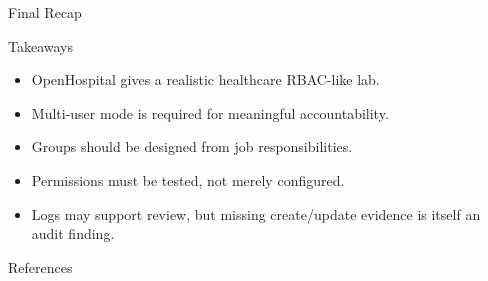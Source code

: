 \documentclass[presentation]{beamer}
\begin{document}
\begin{frame}[c]{Final Recap}
\begin{block}{Takeaways}
\begin{itemize}
    \item OpenHospital gives a realistic healthcare RBAC-like lab.
    \item Multi-user mode is required for meaningful accountability.
    \item Groups should be designed from job responsibilities.
    \item Permissions must be tested, not merely configured.
    \item Logs may support review, but missing create/update evidence is itself an audit finding.
\end{itemize}
\end{block}
\end{frame}

\begin{frame}[allowframebreaks]{References}


\end{frame}
\end{document}
